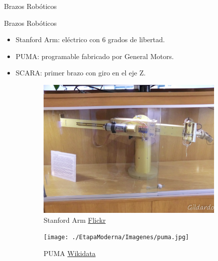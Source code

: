 \begin{frame}[fragile]{Brazos Robóticos}
\vspace{10px}
\pause
{}
\begin{block}{Brazos Robóticos}
	\begin{itemize}
		\item Stanford Arm: eléctrico con 6 grados de libertad.
		\pause
		\item PUMA: programable fabricado por General Motors.
		\pause
		\item SCARA: primer brazo con giro en el eje Z.
	\end{itemize}
\end{block}
\begin{figure}
	\centering
	\pause
	\begin{subfigure}{0.33\textwidth}
		\centering
		\includegraphics[scale=0.08]{./EtapaModerna/Imagenes/stanford_arm.jpg}
		\caption{Stanford Arm \href{https://www.flickr.com/photos/gildardo/6186967797}{Flickr}}
	\end{subfigure}
	\pause
	\begin{subfigure}{0.32\textwidth}
		\centering
		\texttt{[image: ./EtapaModerna/Imagenes/puma.jpg]}
		\caption{PUMA \href{https://es.m.wikipedia.org/wiki/Archivo:Puma_Robotic_Arm_-_GPN-2000-001817.jpg}{Wikidata}}
	\end{subfigure}
	\pause
	\begin{subfigure}{0.33\textwidth}
		\centering

\end{subfigure}
\end{figure}
\end{frame}
